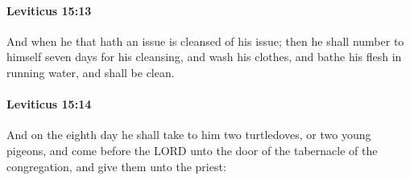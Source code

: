 		\paragraph{Leviticus 15:13} %
			\label{LEVITICUS-15-13}

			And when he that hath an issue is cleansed of his issue; then he shall number to himself seven days for his cleansing, and wash his clothes, and bathe his flesh in running water, and shall be clean.


		\paragraph{Leviticus 15:14} %
			\label{LEVITICUS-15-14}

			And on the eighth day he shall take to him two turtledoves, or two young pigeons, and come before the LORD unto the door of the tabernacle of the congregation, and give them unto the priest:

